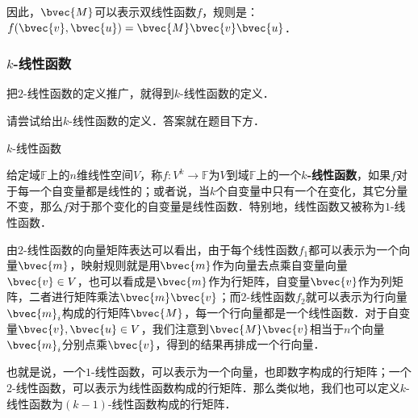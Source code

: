 因此，$\bvec{M}$可以表示双线性函数$f$，规则是：$f(\bvec{v}, \bvec{u})=\bvec{M}\bvec{v}\bvec{u}$．

\subsubsection{$k$-线性函数}

把$2$-线性函数的定义推广，就得到$k$-线性函数的定义．

\begin{exercise}{}
请尝试给出$k$-线性函数的定义．答案就在题目下方．
\end{exercise}

\begin{definition}{$k$-线性函数}

给定域$\mathbb{F}$上的$n$维线性空间$V$，称$f:V^k\rightarrow \mathbb{F}$为$V$到域$\mathbb{F}$上的一个\textbf{$k$-线性函数}，如果$f$对于每一个自变量都是线性的；或者说，当$k$个自变量中只有一个在变化，其它分量不变，那么$f$对于那个变化的自变量是线性函数．特别地，线性函数又被称为$1$-线性函数．

\end{definition}

由$2$-线性函数的向量矩阵表达可以看出，由于每个线性函数$f_1$都可以表示为一个向量$\bvec{m}$，映射规则就是用$\bvec{m}$作为向量去点乘自变量向量$\bvec{v}\in V$，也可以看成是$\bvec{m}$作为行矩阵，自变量$\bvec{v}$作为列矩阵，二者进行矩阵乘法$\bvec{m}\bvec{v}$；而$2$-线性函数$f_2$就可以表示为行向量$\bvec{m}_i$构成的行矩阵$\bvec{M}$，每一个行向量都是一个线性函数．对于自变量$\bvec{v}, \bvec{u}\in V$，我们注意到$\bvec{M}\bvec{v}$相当于$n$个向量$\bvec{m}_i$分别点乘$\bvec{v}$，得到的结果再排成一个行向量．

也就是说，一个$1$-线性函数，可以表示为一个向量，也即数字构成的行矩阵；一个$2$-线性函数，可以表示为线性函数构成的行矩阵．那么类似地，我们也可以定义$k$-线性函数为$(k-1)$-线性函数构成的行矩阵．


